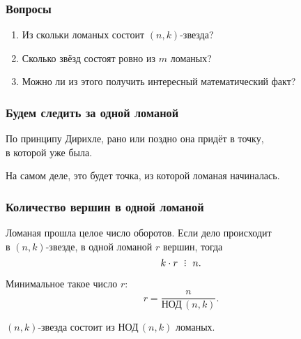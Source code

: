\begin{frame} \frametitle{Вопросы}
     \begin{enumerate}
	\item Из скольки ломаных состоит $(n,k)$-звезда? \medskip
	\item Сколько звёзд состоят ровно из $m$ ломаных? \medskip
	\item Можно ли из этого получить интересный математический факт?
     \end{enumerate}
\end{frame}

\begin{frame} \frametitle{Будем следить за одной ломаной}
	По принципу Дирихле, рано или поздно она придёт в точку,\\ в которой уже была. \pause
     \begin{center}  \end{center}
	На самом деле, это будет точка, из которой ломаная начиналась.
\end{frame}

\begin{frame} \frametitle{Количество вершин в одной ломаной}
Ломаная прошла целое число оборотов. Если дело происходит\\ в $(n,k)$-звезде, в одной ломаной $r$ вершин, тогда
	\[ k \cdot r\ \divsby\ n.\]

Минимальное такое число $r$:
	\[ r = \frac{n}{\text{НОД}\,(n,k)}. \] \pause

\begin{theorem}
	$(n,k)$-звезда состоит из $\text{НОД}\,(n,k)$ ломаных.
\end{theorem}
\end{frame}
